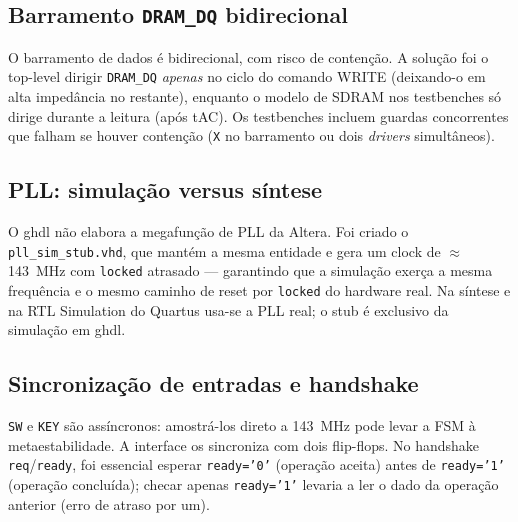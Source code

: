 \documentclass[12pt,a4paper]{article}
\begin{document}
\subsection{Barramento \texttt{DRAM\_DQ} bidirecional}
O barramento de dados é bidirecional, com risco de contenção. A solução foi o
top-level dirigir \texttt{DRAM\_DQ} \emph{apenas} no ciclo do comando WRITE
(deixando-o em alta impedância no restante), enquanto o modelo de SDRAM nos
testbenches só dirige durante a leitura (após tAC). Os testbenches incluem guardas
concorrentes que falham se houver contenção (\texttt{X} no barramento ou dois
\emph{drivers} simultâneos).

\subsection{PLL: simulação versus síntese}
O ghdl não elabora a megafunção de PLL da Altera. Foi criado o
\texttt{pll\_sim\_stub.vhd}, que mantém a mesma entidade e gera um clock de
$\approx$143~MHz com \texttt{locked} atrasado --- garantindo que a simulação exerça
a mesma frequência e o mesmo caminho de reset por \texttt{locked} do hardware real.
Na síntese e na RTL Simulation do Quartus usa-se a PLL real; o stub é exclusivo da
simulação em ghdl.

\subsection{Sincronização de entradas e handshake}
\texttt{SW} e \texttt{KEY} são assíncronos: amostrá-los direto a 143~MHz pode levar
a FSM à metaestabilidade. A interface os sincroniza com dois flip-flops. No
handshake \texttt{req}/\texttt{ready}, foi essencial esperar \texttt{ready='0'}
(operação aceita) antes de \texttt{ready='1'} (operação concluída); checar apenas
\texttt{ready='1'} levaria a ler o dado da operação anterior (erro de atraso por um).
\end{document}
